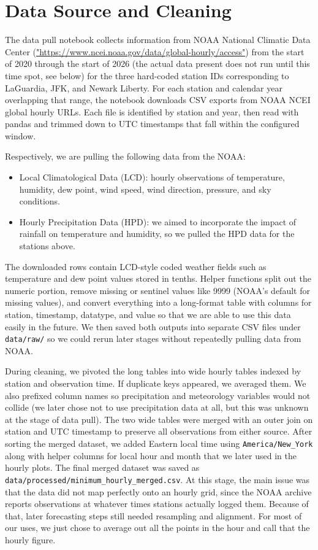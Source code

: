\documentclass{article}
\begin{document}
\section{Data Source and Cleaning}

The data pull notebook collects information from NOAA National Climatic Data Center (\url{"https://www.ncei.noaa.gov/data/global-hourly/access"}) from the start of 2020 through the start of 2026 (the actual data present does not run until this time spot, see below) for the three hard-coded station IDs corresponding to LaGuardia, JFK, and Newark Liberty. For each station and calendar year overlapping that range, the notebook downloads CSV exports from NOAA NCEI global hourly URLs. Each file is identified by station and year, then read with pandas and trimmed down to UTC timestamps that fall within the configured window.

Respectively, we are pulling the following data from the NOAA:
\begin{itemize}
    \item Local Climatological Data (LCD): hourly observations of temperature, humidity, dew point, wind speed, wind direction, pressure, and sky conditions. 
    \item Hourly Precipitation Data (HPD): we aimed to incorporate the impact of rainfall on temperature and humidity, so we pulled the HPD data for the stations above.
\end{itemize}

The downloaded rows contain LCD-style coded weather fields such as temperature and dew point values stored in tenths. Helper functions split out the numeric portion, remove missing or sentinel values like 9999 (NOAA's default for missing values), and convert everything into a long-format table with columns for station, timestamp, datatype, and value so that we are able to use this data easily in the future. We then saved both outputs into separate CSV files under \texttt{data/raw/} so we could rerun later stages without repeatedly pulling data from NOAA.

During cleaning, we pivoted the long tables into wide hourly tables indexed by station and observation time. If duplicate keys appeared, we averaged them. We also prefixed column names so precipitation and meteorology variables would not collide (we later chose not to use precipitation data at all, but this was unknown at the stage of data pull). The two wide tables were merged with an outer join on station and UTC timestamp to preserve all observations from either source. After sorting the merged dataset, we added Eastern local time using \texttt{America/New\_York} along with helper columns for local hour and month that we later used in the hourly plots. The final merged dataset was saved as \texttt{data/processed/minimum\_hourly\_merged.csv}. At this stage, the main issue was that the data did not map perfectly onto an hourly grid, since the NOAA archive reports observations at whatever times stations actually logged them. Because of that, later forecasting steps still needed resampling and alignment. For most of our uses, we just chose to average out all the points in the hour and call that the hourly figure.
\end{document}
